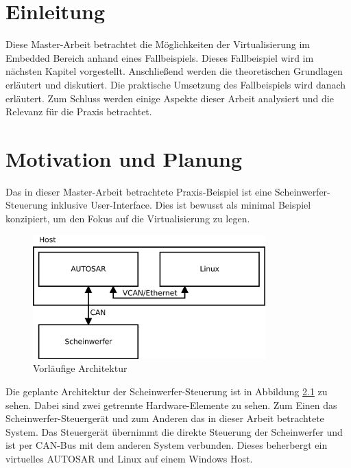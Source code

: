 \documentclass[
  a4paper,					    %
  twoside,
  DIV=calc,     				%
  bibliography=totoc,
  cleardoublepage=empty,
  ngerman,     					%
  final       					%
]{scrbook}
\begin{document}
\mainmatter
\chapter{Einleitung}
\label{sec:Einleitung}
Diese Master-Arbeit betrachtet die Möglichkeiten der Virtualisierung im Embedded Bereich anhand eines Fallbeispiels. Dieses Fallbeispiel wird im nächsten Kapitel vorgestellt. Anschließend werden die theoretischen Grundlagen erläutert und diskutiert. Die praktische Umsetzung des Fallbeispiels wird danach erläutert. Zum Schluss werden einige Aspekte dieser Arbeit analysiert und die Relevanz für die Praxis betrachtet.





\chapter{Motivation und Planung}
\label{sec:MotivationPlanung}
Das in dieser Master-Arbeit betrachtete Praxis-Beispiel ist eine Scheinwerfer-Steuerung inklusive User-Interface. Dies ist bewusst als minimal Beispiel konzipiert, um den Fokus auf die Virtualisierung zu legen.

\begin{figure}[ht]
\centering
\includegraphics[width=0.8\textwidth]{arch_begin}
\caption{Vorläufige Architektur}
\label{fig:arch_begin}
\end{figure}

Die geplante Architektur der Scheinwerfer-Steuerung ist in Abbildung \ref{fig:arch_begin} zu sehen. Dabei sind zwei getrennte Hardware-Elemente zu sehen. Zum Einen das Scheinwerfer-Steuergerät und zum Anderen das in dieser Arbeit betrachtete System. Das Steuergerät übernimmt die direkte Steuerung der Scheinwerfer und ist per CAN-Bus mit dem anderen System verbunden.  Dieses beherbergt ein virtuelles AUTOSAR und Linux auf einem Windows Host.
\end{document}
